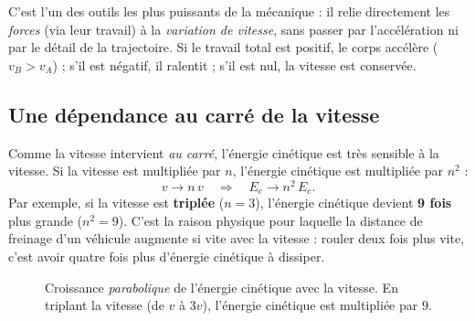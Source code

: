 \documentclass[11pt,a4paper]{article}
\begin{document}
\begin{remarque}
C'est l'un des outils les plus puissants de la mécanique : il relie directement les \emph{forces}
(via leur travail) à la \emph{variation de vitesse}, sans passer par l'accélération ni par le détail
de la trajectoire. Si le travail total est positif, le corps accélère ($v_B>v_A$) ; s'il est
négatif, il ralentit ; s'il est nul, la vitesse est conservée.
\end{remarque}

\subsection{Une dépendance au carré de la vitesse}

\begin{attention}
Comme la vitesse intervient \emph{au carré}, l'énergie cinétique est très sensible à la vitesse.
Si la vitesse est multipliée par $n$, l'énergie cinétique est multipliée par $n^2$ :
\[
v\to n\,v\quad\Longrightarrow\quad E_c\to n^2\,E_c .
\]
Par exemple, si la vitesse est \textbf{triplée} ($n=3$), l'énergie cinétique devient
\textbf{9 fois} plus grande ($n^2=9$). C'est la raison physique pour laquelle la distance de
freinage d'un véhicule augmente si vite avec la vitesse : rouler deux fois plus vite, c'est avoir
quatre fois plus d'énergie cinétique à dissiper.
\end{attention}

\begin{figure}[H]
\centering
{}
\caption{Croissance \emph{parabolique} de l'énergie cinétique avec la vitesse. En triplant la
vitesse (de $v$ à $3v$), l'énergie cinétique est multipliée par $9$.}
\label{fig:ec}
\end{figure}
\end{document}
